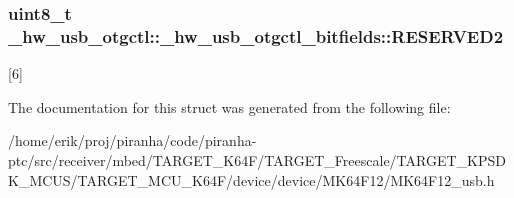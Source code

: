 \subsubsection[{\texorpdfstring{R\+E\+S\+E\+R\+V\+E\+D2}{RESERVED2}}]{\setlength{\rightskip}{0pt plus 5cm}uint8\+\_\+t \+\_\+hw\+\_\+usb\+\_\+otgctl\+::\+\_\+hw\+\_\+usb\+\_\+otgctl\+\_\+bitfields\+::\+R\+E\+S\+E\+R\+V\+E\+D2}\hypertarget{struct__hw__usb__otgctl_1_1__hw__usb__otgctl__bitfields_a4db6f0c513d7c49f0933e5b9bcccd2fc}{}\label{struct__hw__usb__otgctl_1_1__hw__usb__otgctl__bitfields_a4db6f0c513d7c49f0933e5b9bcccd2fc}
\mbox{[}6\mbox{]} 

The documentation for this struct was generated from the following file\+:\begin{DoxyCompactItemize}
\item 
/home/erik/proj/piranha/code/piranha-\/ptc/src/receiver/mbed/\+T\+A\+R\+G\+E\+T\+\_\+\+K64\+F/\+T\+A\+R\+G\+E\+T\+\_\+\+Freescale/\+T\+A\+R\+G\+E\+T\+\_\+\+K\+P\+S\+D\+K\+\_\+\+M\+C\+U\+S/\+T\+A\+R\+G\+E\+T\+\_\+\+M\+C\+U\+\_\+\+K64\+F/device/device/\+M\+K64\+F12/M\+K64\+F12\+\_\+usb.\+h\end{DoxyCompactItemize}
